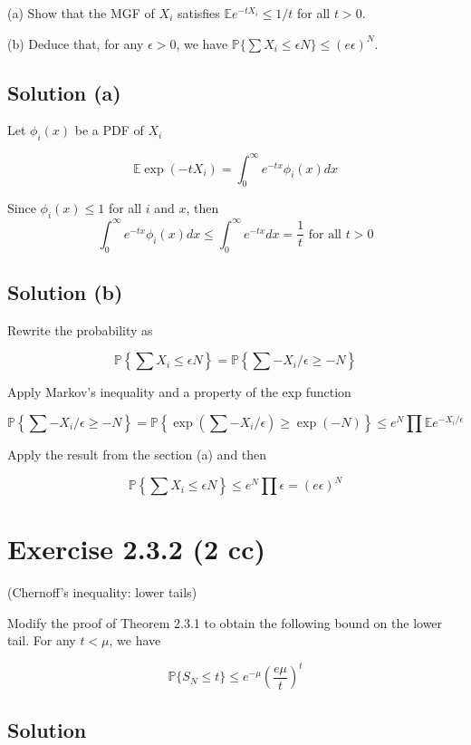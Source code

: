 \documentclass{article}
\begin{document}
(a) Show that the MGF of $X_i$ satisfies $\mathbb E e^{-tX_i} \leq 1/t$ for all $t>0$.

(b) Deduce that, for any $\epsilon > 0$, we have $\mathbb P\{\sum X_i \leq \epsilon N\} \leq (e\epsilon)^N$.

\subsection{Solution (a)}

Let $\phi_i(x)$ be a PDF of $X_i$

$$\mathbb E \exp(-tX_i) = \int_0^\infty e^{-tx} \phi_i(x) dx$$

Since $\phi_i(x) \leq 1$ for all $i$ and $x$, then
$$\int_0^\infty e^{-tx} \phi_i(x) dx \leq \int_0^\infty e^{-tx} dx = \frac{1}{t} \text{ for all } t>0$$

\subsection{Solution (b)}

Rewrite the probability as

$$\mathbb P \left\{\sum X_i \leq \epsilon N\right\} = \mathbb P \left\{\sum -X_i/\epsilon \geq -N\right\}$$

Apply Markov's inequality and a property of the exp function

$$\mathbb P \left\{\sum -X_i/\epsilon \geq -N\right\} = \mathbb P \left\{ \exp\left(\sum -X_i/\epsilon\right) \geq \exp(-N) \right\} \leq e^N\prod \mathbb E e^{-X_i/\epsilon}$$

Apply the result from the section (a) and then

$$\mathbb P \left\{\sum X_i \leq \epsilon N\right\} \leq e^N \prod \epsilon = (e\epsilon)^N$$

\section{Exercise 2.3.2 (2 cc)}

(Chernoff’s inequality: lower tails)

Modify the proof of Theorem 2.3.1 to obtain the following bound on the lower tail. For any $t < \mu$, we have

$$\mathbb P\{S_N \leq t\} \leq e^{-\mu}\left(\frac{e\mu}{t}\right)^t$$

\subsection{Solution}
\end{document}
